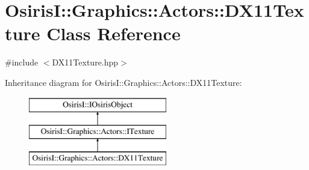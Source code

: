 \hypertarget{class_osiris_i_1_1_graphics_1_1_actors_1_1_d_x11_texture}{\section{Osiris\-I\-:\-:Graphics\-:\-:Actors\-:\-:D\-X11\-Texture Class Reference}
\label{class_osiris_i_1_1_graphics_1_1_actors_1_1_d_x11_texture}
}


{\ttfamily \#include $<$D\-X11\-Texture.\-hpp$>$}

Inheritance diagram for Osiris\-I\-:\-:Graphics\-:\-:Actors\-:\-:D\-X11\-Texture\-:\begin{figure}[H]
\begin{center}
\leavevmode
\includegraphics[height=3.000000cm]{class_osiris_i_1_1_graphics_1_1_actors_1_1_d_x11_texture}
\end{center}
\end{figure}
